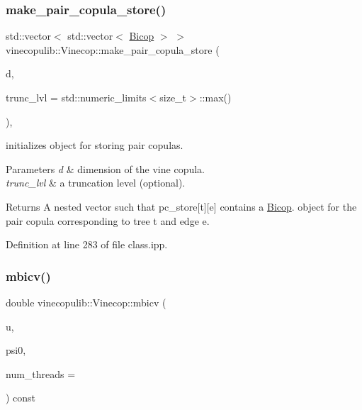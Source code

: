\subsubsection{\texorpdfstring{make\+\_\+pair\+\_\+copula\+\_\+store()}{make\_pair\_copula\_store()}}
{\footnotesize\ttfamily std\+::vector$<$ std\+::vector$<$ \hyperlink{classvinecopulib_1_1_bicop}{Bicop} $>$ $>$ vinecopulib\+::\+Vinecop\+::make\+\_\+pair\+\_\+copula\+\_\+store (\begin{DoxyParamCaption}\item[{const size\+\_\+t}]{d,  }\item[{const size\+\_\+t}]{trunc\+\_\+lvl = {\ttfamily std\+:\+:numeric\+\_\+limits$<$size\+\_\+t$>$\+:\+:max()} }\end{DoxyParamCaption})\hspace{0.3cm}{\ttfamily [inline]}, {\ttfamily [static]}}



initializes object for storing pair copulas. 


\begin{DoxyParams}{Parameters}
{\em d} & dimension of the vine copula. \\
\hline
{\em trunc\+\_\+lvl} & a truncation level (optional). \\
\hline
\end{DoxyParams}
\begin{DoxyReturn}{Returns}
A nested vector such that {\ttfamily pc\+\_\+store\mbox{[}t\mbox{]}\mbox{[}e\mbox{]}} contains a \hyperlink{classvinecopulib_1_1_bicop}{Bicop}. object for the pair copula corresponding to tree {\ttfamily t} and edge {\ttfamily e}. 
\end{DoxyReturn}


Definition at line 283 of file class.\+ipp.

\mbox{\label{classvinecopulib_1_1_vinecop_abb2e75c3531d813125dda78017f0b219}} 
\subsubsection{\texorpdfstring{mbicv()}{mbicv()}}
{\footnotesize\ttfamily double vinecopulib\+::\+Vinecop\+::mbicv (\begin{DoxyParamCaption}\item[{const Eigen\+::\+Matrix\+Xd \&}]{u,  }\item[{const double}]{psi0,  }\item[{const size\+\_\+t}]{num\+\_\+threads = {} }\end{DoxyParamCaption}) const\hspace{0.3cm}{\ttfamily [inline]}}



